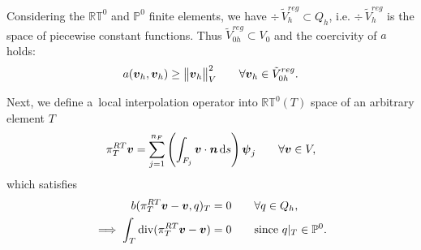 Considering the $\mathbb{RT}^0$ and $\mathbb P^0$ finite elements,
we have $\div\,\tilde V_{h}^{reg}\subset Q_h$, i.e. $\div\, \tilde V_h^{reg}$ is the space of piecewise constant functions.
Thus $\tilde V_{0h}^{reg} \subset V_0$ and the coercivity of $a$ holds:
\begin{equation}
a(\mathbf{\boldsymbol{v}}_h,\mathbf{\boldsymbol{v}}_h)\geq \bigl\Vert\mathbf{\boldsymbol{v}}_h\bigr\Vert^2_V  \qquad \forall \mathbf{\boldsymbol{v}}_h\in \tilde V_{0h}^{reg}.
\end{equation}


Next, we define a~local interpolation operator into $\mathbb{RT}^0(T)$ space of an arbitrary element $T$
\begin{equation}
    \pi^{RT}_T\mathbf{\boldsymbol{v}} = \sum_{j=1}^{n_F} \left( \int_{F_j} \mathbf{\boldsymbol{v}} \cdot \mathbf{\boldsymbol{n}} \,{\rm d} s \right)  \mathbf{\boldsymbol{\psi}}_j
    \qquad \forall \mathbf{\boldsymbol{v}} \in V, \label{eqn:local_rt_interpolator}
\end{equation}
which satisfies
\begin{align}
b(\pi^{RT}_T\mathbf{\boldsymbol{v}}- \mathbf{\boldsymbol{v}}, q)_T &= 0 \qquad \forall q\in Q_h,\\ 
\implies \int_T {\rm div}(\pi^{RT}_T\mathbf{\boldsymbol{v}}- \mathbf{\boldsymbol{v}}) &= 0 \qquad \textrm{since } q|_T\in \mathbb{P}^0.
\end{align}

